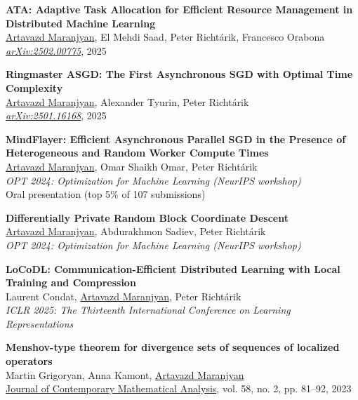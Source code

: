 \documentclass[11pt,a4paper,sans]{moderncv}        %
\newcommand{\red}{\color{cherry}}
\newcommand{\highlight}[1]{{\red #1}}
\begin{document}
\begin{etaremune}

\item \textbf{ATA: Adaptive Task Allocation for Efficient Resource Management in Distributed Machine Learning}\\
\underline{Artavazd Maranjyan}, El Mehdi Saad, Peter Richtárik, Francesco Orabona\\
\textcolor{accent}{\href{https://arxiv.org/abs/2502.00775}{\textit{arXiv:2502.00775}}}, 2025

\item \textbf{Ringmaster ASGD: The First Asynchronous SGD with Optimal Time Complexity}\\
\underline{Artavazd Maranjyan}, Alexander Tyurin, Peter Richtárik\\
\textcolor{accent}{\href{https://arxiv.org/abs/2501.16168}{\textit{arXiv:2501.16168}}}, 2025

\item \textbf{MindFlayer: Efficient Asynchronous Parallel SGD in the Presence of Heterogeneous and Random Worker Compute Times}\\
\underline{Artavazd Maranjyan}, Omar Shaikh Omar, Peter Richtárik\\
\textit{OPT 2024: Optimization for Machine Learning (NeurIPS workshop)}\\
\highlight{Oral presentation (top 5\% of 107 submissions)}

\item \textbf{Differentially Private Random Block Coordinate Descent}\\
\underline{Artavazd Maranjyan}, Abdurakhmon Sadiev, Peter Richtárik\\
\textit{OPT 2024: Optimization for Machine Learning (NeurIPS workshop)}

\item \textbf{LoCoDL: Communication-Efficient Distributed Learning with Local Training and Compression}\\
Laurent Condat, \underline{Artavazd Maranjyan}, Peter Richtárik\\
\textit{ICLR 2025: The Thirteenth International Conference on Learning Representations} 

\item \textbf{Menshov-type theorem for divergence sets of sequences of localized operators}\\
Martin Grigoryan, Anna Kamont, \underline{Artavazd Maranjyan}\\
\href{https://doi.org/10.3103/S106836232302005X}{Journal of Contemporary Mathematical Analysis}, vol. 58, no. 2, pp. 81–92, 2023


\end{etaremune}
\end{document}
